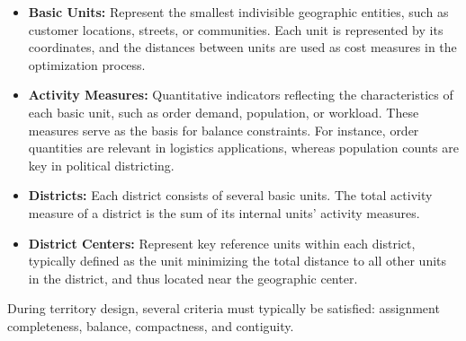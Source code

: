 \documentclass[preprint,12pt,authoryear]{elsarticle}
\begin{document}
\begin{itemize}
    \item \textbf{Basic Units:} Represent the smallest indivisible geographic entities, such as customer locations, streets, or communities. Each unit is represented by its coordinates, and the distances between units are used as cost measures in the optimization process.

    \item \textbf{Activity Measures:} Quantitative indicators reflecting the characteristics of each basic unit, such as order demand, population, or workload. These measures serve as the basis for balance constraints. For instance, order quantities are relevant in logistics applications, whereas population counts are key in political districting.

    \item \textbf{Districts:} Each district consists of several basic units. The total activity measure of a district is the sum of its internal units’ activity measures.

    \item \textbf{District Centers:} Represent key reference units within each district, typically defined as the unit minimizing the total distance to all other units in the district, and thus located near the geographic center.
\end{itemize}

During territory design, several criteria must typically be satisfied: assignment completeness, balance, compactness, and contiguity.
\end{document}
